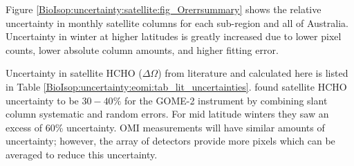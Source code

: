     
    Figure \ref{BioIsop:uncertainty:satellite:fig_Orerrsummary} shows the relative uncertainty in monthly satellite columns for each sub-region and all of Australia.
    Uncertainty in winter at higher latitudes is greatly increased due to lower pixel counts, lower absolute column amounts, and higher fitting error.
    
    
    
    
    Uncertainty in satellite HCHO ($\Delta{\Omega}$) from literature and calculated here is listed in Table \ref{BioIsop:uncertainty:eomi:tab_lit_uncertainties}.
    \textcite{DeSmedt2012} found satellite HCHO uncertainty to be $30-40\%$ for the GOME-2 instrument by combining slant column systematic and random errors.
    For mid latitude winters they saw an excess of 60\% uncertainty.
    OMI measurements will have similar amounts of uncertainty; however, the array of detectors provide more pixels which can be averaged to reduce this uncertainty.
    
